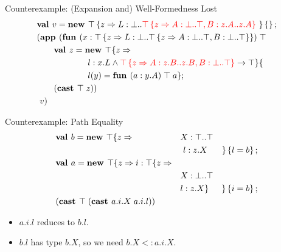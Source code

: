 \documentclass{beamer}
\begin{document}
\begin{frame}[fragile]{Counterexample: (Expansion and) Well-Formedness Lost}
\begin{align*}
&\textbf{val }v = \textbf{new }\top \left\{z \Rightarrow L : \bot..{\color{red}{\top\left\{z \Rightarrow A : \bot..\top, B : z.A..z.A \right\}}}\  \right\} \left\{\right\} ;\;\\&
(\textbf{app }(\textbf{fun } (x:\top \left\{z \Rightarrow L : \bot..\top \left\{z \Rightarrow A : \bot..\top, B : \bot..\top \right\} \right\})\;\top\;\\&\quad\quad
\textbf{val }z = \textbf{new }\top \{z \Rightarrow \\&\quad\quad\quad\quad\quad\quad
l : x.L \wedge {\color{red}{\top\left\{z \Rightarrow A : z.B..z.B, B : \bot..\top\right\}}} \rightarrow \top \}\{\\&\quad\quad\quad\quad\quad\quad
l(y) = \textbf{fun } (a:y.A)\;\top\;a\} ;\;\\&
\quad\quad (\textbf{cast }\top\;z)
)\;\\&\ v)
\end{align*}
\end{frame}

\begin{frame}[fragile]{Counterexample: Path Equality}
\begin{align*}
&\textbf{val }b = \textbf{new }\top \{z \Rightarrow &&X : \top..\top&\\
&&&\ l : z.X& \}\left\{l = b\right\} ;\;\\&
\textbf{val }a = \textbf{new }\top \{z \Rightarrow i : \top \{z \Rightarrow &&&\\
&&&X : \bot..\top\\
&&&l : z.X \}& \}\left\{i = b\right\} ;\;\\&
{(\textbf{cast }\top\;(\textbf{cast }a.i.X\;a.i.l))}
\end{align*}

\begin{itemize}
\item $a.i.l$ reduces to $b.l$.
\item $b.l$ has type $b.X$, so we need $b.X <: a.i.X$.
\end{itemize}
\end{frame}
\end{document}
